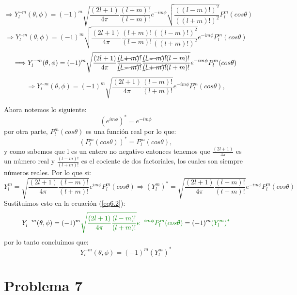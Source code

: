 \documentclass[10pt]{article}
\begin{document}
$$
\Longrightarrow Y_{l}^{-m}(\theta,\phi)=(-1)^{m}\sqrt{
    \frac{(2l+1)}{4\pi}\frac{(l+m)!}{(l-m)!}}e^{
    -im\phi}\sqrt{\frac{((l-m)!)^{2}}{((l+m)!)^{2}}}P_{l}^{m}(cos\theta)
$$
$$
\Longrightarrow Y_{l}^{-m}(\theta,\phi)=(-1)^{m}\sqrt{
    \frac{(2l+1)}{4\pi}\frac{(l+m)!}{(l-m)!}\frac{
        ((l-m)!)^{2}}{((l+m)!)^{2}}}e^{
        -im\phi}P_{l}^{m}(cos\theta)
$$
$$
\Longrightarrow Y_{l}^{-m}(\theta,\phi)=(-1)^{m}\sqrt{
    \frac{(2l+1)}{4\pi}\frac{\cancel{(l+m)!}}{\cancel{(l-m)!}}
    \frac{\cancel{(l-m)!}(l-m)!}{\cancel{(l+m)!}(l+m)!}}e^{
        -im\phi}P_{l}^{m}(cos\theta)
$$
\begin{equation}
    \Longrightarrow Y_{l}^{-m}(\theta,\phi)=(-1)^{m}\sqrt{
    \frac{(2l+1)}{4\pi}
    \frac{(l-m)!}{(l+m)!}}e^{
        -im\phi}P_{l}^{m}(cos\theta),
    \label{eq6.2}
\end{equation}

Ahora notemos lo siguiente:
$$
(e^{im\phi})^{*}=e^{-im\phi}
$$
por otra parte, $P_{l}^{m}(cos\theta)$ es una función real por lo que:
$$
(P_{l}^{m}(cos\theta))^{*}=P_{l}^{m}(cos\theta),
$$
y como sabemos que l es un entero no negativo entonces tenemos que $\frac{(2l+1)}{4\pi}$ es un número real
y $\frac{(l-m)!}{(l+m)!}$ es el cociente de dos factoriales, los cuales son siempre números reales.
Por lo que si:
$$
Y_{l}^{m}=\sqrt{
    \frac{(2l+1)}{4\pi}\frac{(l-m)!}{(l+m)!}}e^{im\phi}P_{l}^{m}(cos\theta)
    \Longrightarrow \left(  Y_{l}^{m}\right)^{*}=\sqrt{
    \frac{(2l+1)}{4\pi}\frac{(l-m)!}{(l+m)!}}e^{-im\phi}P_{l}^{m}(cos\theta)
$$
Sustituimos esto en la ecuación (\ref{eq6.2}):
$$
Y_{l}^{-m}(\theta,\phi)=(-1)^{m}{\color{DarkGreen}{\sqrt{
    \frac{(2l+1)}{4\pi}
    \frac{(l-m)!}{(l+m)!}}e^{
        -im\phi}P_{l}^{m}(cos\theta)}} =(-1)^{m}{\color{DarkGreen} \left(  Y_{l}^{m}\right)^{*} }
$$
por lo tanto concluimos que:
\[
\boxed{
Y_{l}^{-m}(\theta, \phi) = (-1)^{m} \left( Y_{l}^{m} \right)^{*}
}
\]


\medskip

\section{Problema 7}
\end{document}
